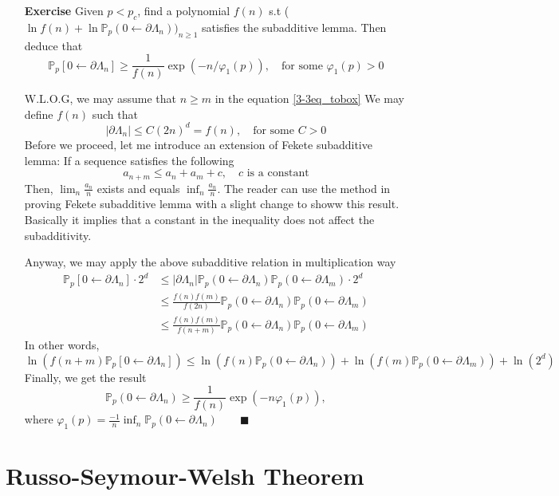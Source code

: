 \documentclass[12pt,a4paper]{report}
\theoremstyle{definition}
\newcommand{\SOL}{\fbox{ \tt s\parbox[b][2pt][c]{6pt}{o}\hspace*{-7pt} L:}}
\begin{document}
\begin{enumerate}
	\item[\textbf{Exercise}] Given $p < p_c$, find a polynomial $f(n)$ s.t ( $\ln{f(n)} + \ln{\mathbb{P}_p(0 \longleftarrow \partial \Lambda_n)})_{n \geq 1}$ 
	satisfies the subadditive lemma. Then deduce that
	$$
	\mathbb{P}_p[0 \longleftarrow \partial\Lambda_n] \geq \frac{1}{f(n)}\exp{(-n/\varphi_1(p))}, \quad \text{for some $\varphi_1(p) > 0$} 
	$$  
	\item[\SOL] W.L.O.G, we may assume that $n \geq m $ in the equation \ref{3-3eq_tobox} 
	We may define $f(n)$ such that 
	\begin{equation}
		|\partial \Lambda_n| \leq C(2n)^{d} = f(n),\quad \text{for some  $C > 0$}
	\end{equation}
	Before we proceed, let me introduce an extension of Fekete subadditive lemma:
	If a sequence satisfies the following
	$$
		a_{n+m} \leq a_n + a_m + c, \quad \text{$c$ is a constant}
	$$
	Then, $\lim_n \frac{a_n}{n}$ exists and equals $\inf_n \frac{a_n}{n}$. The reader can use the method in proving Fekete subadditive lemma with a slight change to showw this result.
	Basically it implies that a constant in the inequality does not affect the subadditivity.
	
	Anyway, we may apply the above subadditive relation in multiplication way 
	\begin{equation}
		\begin{aligned}
			\mathbb{P}_p[0 \longleftarrow \partial\Lambda_n] \cdot 2^d  & \leq |\partial \Lambda_n| \mathbb{P}_p(0 \longleftarrow \partial \Lambda_n)\mathbb{P}_p(0 \longleftarrow \partial \Lambda_m)\cdot 2^d
														\\	  & \leq \frac{f(n)f(m)}{f(2n)}\mathbb{P}_p(0 \longleftarrow \partial \Lambda_n)\mathbb{P}_p(0 \longleftarrow \partial \Lambda_m)
														\\    & \leq \frac{f(n)f(m)}{f(n+m)}\mathbb{P}_p(0 \longleftarrow \partial \Lambda_n)\mathbb{P}_p(0 \longleftarrow \partial \Lambda_m)
		\end{aligned}
	\end{equation}
	In other words, 
	$$
	\ln{(f(n+m) \mathbb{P}_p[0 \longleftarrow \partial\Lambda_n])} \leq \ln{\left( f(n) \mathbb{P}_p(0 \longleftarrow \partial \Lambda_n)\right) } + \ln{\left( f(m) \mathbb{P}_p(0 \longleftarrow \partial \Lambda_m)\right)} + \ln{(2^d)}
	$$ 
	Finally, we get the result
	$$
	\mathbb{P}_p(0 \longleftarrow \partial \Lambda_n) \geq \frac{1}{f(n)}\exp{(-n\varphi_1(p))},
	$$
	where $\varphi_1(p) = \frac{-1}{n}\inf_n  \mathbb{P}_p(0 \longleftarrow \partial \Lambda_n)\qquad \blacksquare$
\end{enumerate}


\chapter{Russo-Seymour-Welsh Theorem}
\printbibliography
\end{document}
